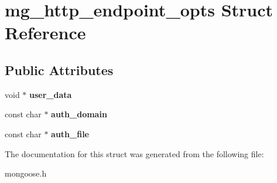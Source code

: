 \hypertarget{structmg__http__endpoint__opts}{}\section{mg\+\_\+http\+\_\+endpoint\+\_\+opts Struct Reference}
\label{structmg__http__endpoint__opts}
\subsection*{Public Attributes}
\begin{DoxyCompactItemize}
\item 
\mbox{\label{structmg__http__endpoint__opts_acdb6a63492d91f7e1c4f34242ba6be1d}} 
void $\ast$ {\bfseries user\+\_\+data}
\item 
\mbox{\label{structmg__http__endpoint__opts_a5af8bb0311abbac3f9388c4b95210dac}} 
const char $\ast$ {\bfseries auth\+\_\+domain}
\item 
\mbox{\label{structmg__http__endpoint__opts_a57ae875a1cc356870d396f3d864d2fc8}} 
const char $\ast$ {\bfseries auth\+\_\+file}
\end{DoxyCompactItemize}


The documentation for this struct was generated from the following file\+:\begin{DoxyCompactItemize}
\item 
mongoose.\+h\end{DoxyCompactItemize}
